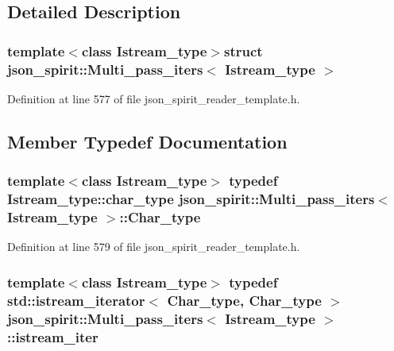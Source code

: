 \subsection{Detailed Description}
\subsubsection*{template$<$class Istream\+\_\+type$>$struct json\+\_\+spirit\+::\+Multi\+\_\+pass\+\_\+iters$<$ Istream\+\_\+type $>$}



Definition at line 577 of file json\+\_\+spirit\+\_\+reader\+\_\+template.\+h.



\subsection{Member Typedef Documentation}
\hypertarget{structjson__spirit_1_1_multi__pass__iters_af055928abdd9390a2c64285222b31fc6}{}
\subsubsection[{Char\+\_\+type}]{\setlength{\rightskip}{0pt plus 5cm}template$<$class Istream\+\_\+type$>$ typedef Istream\+\_\+type\+::char\+\_\+type {\bf json\+\_\+spirit\+::\+Multi\+\_\+pass\+\_\+iters}$<$ Istream\+\_\+type $>$\+::{\bf Char\+\_\+type}}\label{structjson__spirit_1_1_multi__pass__iters_af055928abdd9390a2c64285222b31fc6}


Definition at line 579 of file json\+\_\+spirit\+\_\+reader\+\_\+template.\+h.

\hypertarget{structjson__spirit_1_1_multi__pass__iters_a93811375311c40a51de7669845cf3bc6}{}
\subsubsection[{istream\+\_\+iter}]{\setlength{\rightskip}{0pt plus 5cm}template$<$class Istream\+\_\+type$>$ typedef std\+::istream\+\_\+iterator$<$ {\bf Char\+\_\+type}, {\bf Char\+\_\+type} $>$ {\bf json\+\_\+spirit\+::\+Multi\+\_\+pass\+\_\+iters}$<$ Istream\+\_\+type $>$\+::{\bf istream\+\_\+iter}}\label{structjson__spirit_1_1_multi__pass__iters_a93811375311c40a51de7669845cf3bc6}


